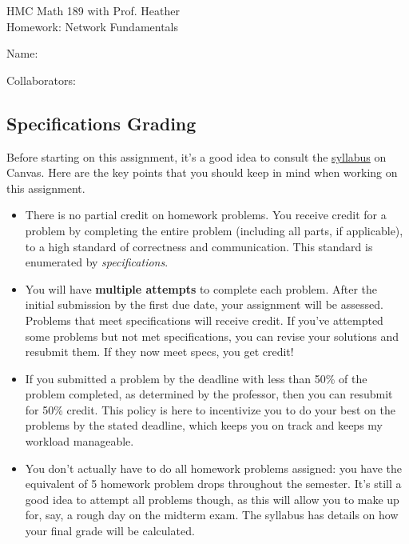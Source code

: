 \documentclass[11pt]{article}
\begin{document}
\begin{titlepage}

HMC Math 189 with Prof. Heather\\ 
Homework: Network Fundamentals

\bigskip

Name:

\bigskip
Collaborators: 

\subsection*{Specifications Grading}

Before starting on this assignment, it's a good idea to consult the \href{https://harveymuddcollege.instructure.com/courses/1418/assignments/syllabus}{syllabus} on Canvas. 
Here are the key points that you should keep in mind when working on this assignment.
\begin{itemize}
    \item There is no partial credit on homework problems. You receive credit for a problem by completing the entire problem (including all parts, if applicable), to a high standard of correctness and communication. 
    This standard is enumerated by \emph{specifications}. 
    \item You will have \textbf{multiple attempts} to complete each problem. 
    After the initial submission by the first due date, your assignment will be assessed. 
    Problems that meet specifications will receive credit. 
    If you've attempted some problems but not met specifications, you can revise your solutions and resubmit them. 
    If they now meet specs, you get credit! 
    \item If you submitted a problem by the deadline with less than 50\% of the problem completed, as determined by the professor, then you can resubmit for 50\% credit. 
    This policy is here to incentivize you to do your best on the problems by the stated deadline, which keeps you on track and keeps my workload manageable. 
    \item You don't actually have to do all homework problems assigned: you have the equivalent of 5 homework problem drops throughout the semester. 
    It's still a good idea to attempt all problems though, as this will allow you to make up for, say, a rough day on the midterm exam. 
    The syllabus has details on how your final grade will be calculated. 
\end{itemize}

\pagebreak


\end{titlepage}
\end{document}

